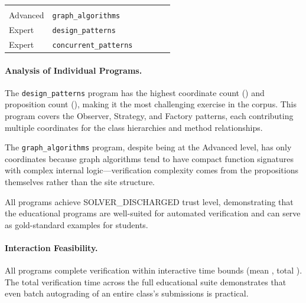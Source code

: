 \documentclass[11pt]{article}
\begin{document}
\begin{table}[t]
\begin{tabular}{llrrrr}
  \ppLXVIedusortingalgorithmsTrust{} &
  \ppLXVIedusortingalgorithmsTime{} \\
Advanced & \texttt{graph\_algorithms} &
  \ppLXVIedugraphalgorithmsCoords{} &
  \ppLXVIedugraphalgorithmsProps{} &
  \ppLXVIedugraphalgorithmsTrust{} &
  \ppLXVIedugraphalgorithmsTime{} \\
\midrule
Expert & \texttt{design\_patterns} &
  \ppLXVIedudesignpatternsCoords{} &
  \ppLXVIedudesignpatternsProps{} &
  \ppLXVIedudesignpatternsTrust{} &
  \ppLXVIedudesignpatternsTime{} \\
Expert & \texttt{concurrent\_patterns} &
  \ppLXVIeduconcurrentpatternsCoords{} &
  \ppLXVIeduconcurrentpatternsProps{} &
  \ppLXVIeduconcurrentpatternsTrust{} &
  \ppLXVIeduconcurrentpatternsTime{} \\
\bottomrule
\end{tabular}
\end{table}

\paragraph{Analysis of Individual Programs.}
The \texttt{design\_patterns} program has the highest coordinate count
(\ppLXVIedudesignpatternsCoords{}) and proposition count
(\ppLXVIedudesignpatternsProps{}), making it the most challenging exercise
in the corpus. This program covers the Observer, Strategy, and Factory
patterns, each contributing multiple coordinates for the class hierarchies
and method relationships.

The \texttt{graph\_algorithms} program, despite being at the Advanced level,
has only \ppLXVIedugraphalgorithmsCoords{} coordinates because graph
algorithms tend to have compact function signatures with complex internal
logic---verification complexity comes from the propositions themselves rather
than the site structure.

All \ppLXVIprogramCount{} programs achieve SOLVER\_DISCHARGED trust level,
demonstrating that the educational programs are well-suited for automated
verification and can serve as gold-standard examples for students.

\paragraph{Interaction Feasibility.}
All \ppLXVIprogramCount{} programs complete verification within interactive
time bounds (mean \ppLXVItimeMean{}, total \ppLXVItimeTotal{}).
The total verification time across the full educational
suite demonstrates that even batch autograding of an entire class's
submissions is practical.
\end{document}
